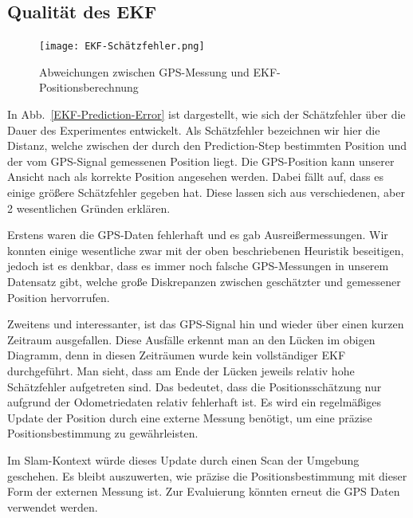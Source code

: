 \documentclass[11pt]{scrartcl}
\begin{document}
{\subsection{Qualität des EKF}
\begin{figure}[!t]
	\centering
	\texttt{[image: EKF-Schätzfehler.png]}
	\caption{Abweichungen zwischen GPS-Messung und EKF-Positionsberechnung}
	\label{EKF-Schätzfehler}
\end{figure}

In Abb.~\ref{EKF-Prediction-Error} ist dargestellt, wie sich der Schätzfehler über die Dauer des Experimentes entwickelt. Als Schätzfehler bezeichnen wir hier die Distanz, welche zwischen der durch den Prediction-Step bestimmten Position und der vom GPS-Signal gemessenen Position liegt. Die GPS-Position kann unserer Ansicht nach als korrekte Position angesehen werden. 
Dabei fällt auf, dass es einige größere Schätzfehler gegeben hat. Diese lassen sich aus verschiedenen, aber 2 wesentlichen Gründen erklären.

Erstens waren die GPS-Daten fehlerhaft und es gab Ausreißermessungen. Wir konnten einige wesentliche zwar mit der oben beschriebenen Heuristik beseitigen, jedoch ist es denkbar, dass es immer noch falsche GPS-Messungen in unserem Datensatz gibt, welche große Diskrepanzen zwischen geschätzter und gemessener Position hervorrufen.

Zweitens und interessanter, ist das GPS-Signal hin und wieder über einen kurzen Zeitraum ausgefallen. Diese Ausfälle erkennt man an den Lücken im obigen Diagramm, denn in diesen Zeiträumen wurde kein vollständiger EKF durchgeführt. Man sieht, dass am Ende der Lücken jeweils relativ hohe Schätzfehler aufgetreten sind. Das bedeutet, dass die Positionsschätzung nur aufgrund der Odometriedaten relativ fehlerhaft ist. Es wird ein regelmäßiges Update der Position durch eine externe Messung benötigt, um eine präzise Positionsbestimmung zu gewährleisten.

Im Slam-Kontext würde dieses Update durch einen Scan der Umgebung geschehen. Es bleibt auszuwerten, wie präzise die Positionsbestimmung mit dieser Form der externen Messung ist. Zur Evaluierung könnten erneut die GPS Daten verwendet werden.

}
\end{document}
